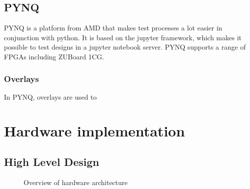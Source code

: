 \subsection{PYNQ}
PYNQ is a platform from AMD that makes test processes a lot easier in conjunction with python. It is based on the jupyter framework, which makes it possible to test designs in a jupyter notebook server. PYNQ supports a range of FPGAs including ZUBoard 1CG. 

\subsubsection{Overlays}
In PYNQ, overlays are used to 









\section{Hardware implementation}



\subsection{High Level Design}
\begin{figure}[h]
    \centering
    
    \caption{Overview of hardware architecture}
    \label{fig:hdl_flow}
\end{figure}




